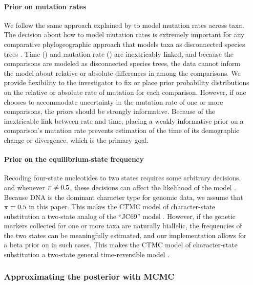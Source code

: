 \paragraph{Prior on mutation rates}
We follow the same approach explained by \citet{Oaks2018ecoevolity} to model
mutation rates across taxa.
The decision about how to model mutation rates is extremely important for any
comparative phylogeographic approach that models taxa as disconnected
species trees
\citep[\fig{}~\ref{fig:modelCartoon}; e.g.,][]{Hickerson2006,Hickerson2007,Huang2011,Chan2014,Oaks2014dpp,Xue2015,Burbrink2016,Xue2017,Gehara2017,Oaks2018ecoevolity}.
Time (\etime) and mutation rate (\murate) are inextricably linked, and because
the comparisons are modeled as disconnected species trees, the data cannot
inform the model about relative or absolute differences in \murate among the
comparisons.
We provide flexibility to the investigator to fix or place prior probability
distributions on the relative or absolute rate of mutation for each comparison.
However, if one chooses to accommodate uncertainty in the mutation rate of one
or more comparisons, the priors should be strongly informative.
Because of the inextricable link between rate and time,
placing a weakly informative prior on a comparison's mutation rate prevents
estimation of the time of its demographic change or divergence,
which is the primary goal.

\paragraph{Prior on the equilibrium-state frequency}
Recoding four-state nucleotides to two states requires some arbitrary
decisions, and whenever $\pi_{} \neq 0.5$, these decisions can affect
the likelihood of the model \citep{Oaks2018ecoevolity}.
Because DNA is the dominant character type for genomic data, we assume that
$\pi_{} = 0.5$ in this paper.
This makes the CTMC model of character-state substitution a two-state analog of
the ``JC69'' model \citep{JC1969}.
However, if the genetic markers collected for one or more taxa are naturally
biallelic, the frequencies of the two states can be meaningfully estimated, and
our implementation allows for a beta prior on \gfreq in such cases.
This makes the CTMC model of character-state substitution a two-state general
time-reversible model \citep{Tavare1986}.

\subsubsection{Approximating the posterior with MCMC}

